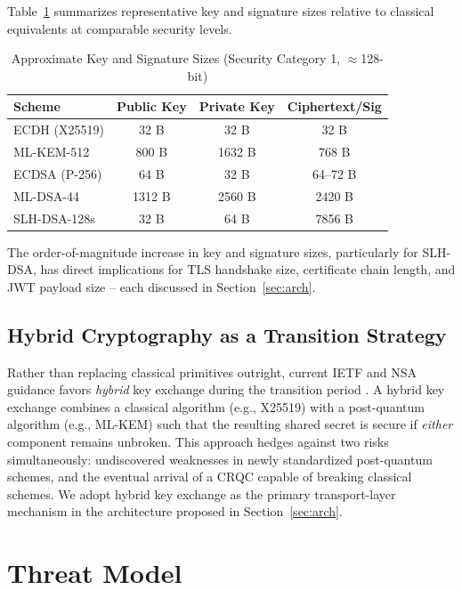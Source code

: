 \documentclass[conference]{IEEEtran}
\begin{document}
Table~\ref{tab:algo-comparison} summarizes representative key and signature
sizes relative to classical equivalents at comparable security levels.

\begin{table}[h]
\centering
\caption{Approximate Key and Signature Sizes (Security Category 1, $\approx$128-bit)}
\label{tab:algo-comparison}
\begin{tabular}{@{}lccc@{}}
\toprule
\textbf{Scheme} & \textbf{Public Key} & \textbf{Private Key} & \textbf{Ciphertext/Sig} \\
\midrule
ECDH (X25519)   & 32 B    & 32 B    & 32 B \\
ML-KEM-512      & 800 B   & 1632 B  & 768 B \\
ECDSA (P-256)   & 64 B    & 32 B    & 64--72 B \\
ML-DSA-44       & 1312 B  & 2560 B  & 2420 B \\
SLH-DSA-128s    & 32 B    & 64 B    & 7856 B \\
\bottomrule
\end{tabular}
\end{table}

The order-of-magnitude increase in key and signature sizes, particularly for
SLH-DSA, has direct implications for TLS handshake size, certificate chain
length, and JWT payload size -- each discussed in Section~\ref{sec:arch}.

\subsection{Hybrid Cryptography as a Transition Strategy}

Rather than replacing classical primitives outright, current IETF and NSA
guidance favors \emph{hybrid} key exchange during the transition period
\cite{ietf_hybrid_kex,nsa_cnsa2}. A hybrid key exchange combines a classical
algorithm (e.g., X25519) with a post-quantum algorithm (e.g., ML-KEM) such
that the resulting shared secret is secure if \emph{either} component
remains unbroken. This approach hedges against two risks simultaneously:
undiscovered weaknesses in newly standardized post-quantum schemes, and the
eventual arrival of a CRQC capable of breaking classical schemes. We adopt
hybrid key exchange as the primary transport-layer mechanism in the
architecture proposed in Section~\ref{sec:arch}.

\section{Threat Model}
\end{document}
